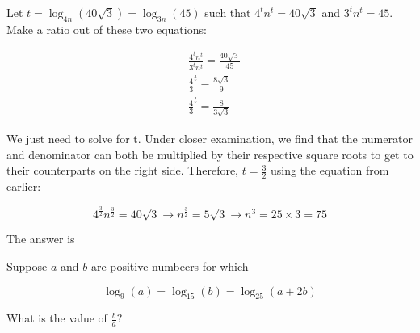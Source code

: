 \begin{solution}

Let $ t = \log_{4n}(40\sqrt{3}) = \log_{3n}(45) $ such that $4^tn^t = 40\sqrt{3}$ and
$3^tn^t = 45$. Make a ratio out of these two equations:

$$
\begin{aligned}
& \frac{4^tn^t}{3^tn^t} = \frac{40\sqrt{3}}{45} \\
& \frac{4}{3}^t = \frac{8\sqrt{3}}{9} \\
& \frac{4}{3}^t = \frac{8}{3\sqrt{3}}
\end{aligned}
$$

We just need to solve for t. Under closer examination, we find that the numerator and denominator can both be multiplied by their respective square roots to get to their counterparts on the right side. Therefore, $t=\frac{3}{2}$ using the equation from earlier:

$$
4^\frac{3}{2}n^\frac{3}{2} = 40\sqrt{3} \rightarrow n^\frac{3}{2} = 5\sqrt{3} \rightarrow
n^3 = 25 \times 3 = 75
$$

The answer is 

\end{solution}


\begin{question}

Suppose $a$ and $b$ are positive numbeers for which

$$
  \log_9(a) = \log_{15}(b) = \log_{25}(a+2b)
$$

What is the value of $\frac{b}{a}?$

\end{question}
    
